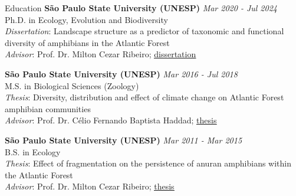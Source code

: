 \documentclass{resume}
\begin{document}
\begin{rSection}{Education}
\textbf{São Paulo State University (UNESP)} \hfill {\em Mar 2020 - Jul 2024}\\
Ph.D. in Ecology, Evolution and Biodiversity\\
\textit{Dissertation}: Landscape structure as a predictor of taxonomic and functional diversity of amphibians in the Atlantic Forest\\
\textit{Advisor}: Prof. Dr. Milton Cezar Ribeiro; \href{https://hdl.handle.net/11449/256726}{\underline{dissertation}}

\textbf{São Paulo State University (UNESP)} \hfill {\em Mar 2016 - Jul 2018}\\
M.S. in Biological Sciences (Zoology)\\
\textit{Thesis}: Diversity, distribution and effect of climate change on Atlantic Forest amphibian communities\\
\textit{Advisor}: Prof. Dr. Célio Fernando Baptista Haddad; \href{http://hdl.handle.net/11449/154993}{\underline{thesis}}

\textbf{São Paulo State University (UNESP)} \hfill {\em Mar 2011 - Mar 2015}\\
B.S. in Ecology\\
\textit{Thesis}: Effect of fragmentation on the persistence of anuran amphibians within the Atlantic Forest\\
\textit{Advisor}: Prof. Dr. Milton Cezar Ribeiro; \href{http://hdl.handle.net/11449/138991}{\underline{thesis}}
\end{rSection}
\end{document}

